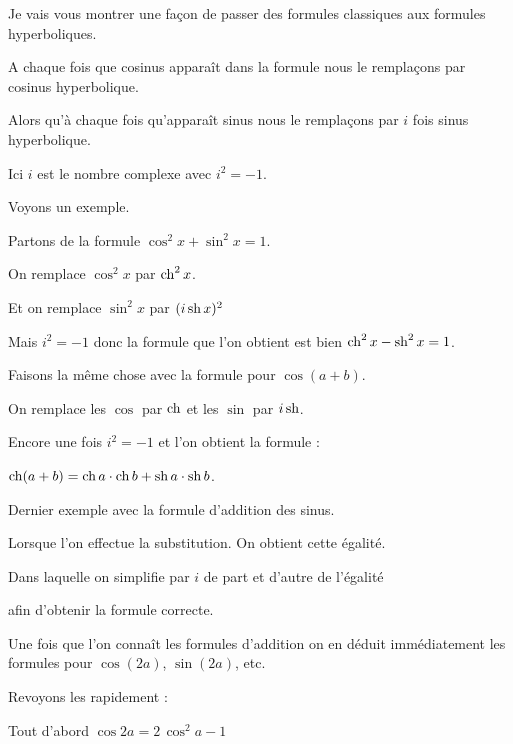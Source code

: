 Je vais vous montrer une façon de passer des formules classiques aux formules hyperboliques.

\change

A chaque fois que cosinus apparaît dans la formule nous le remplaçons par cosinus hyperbolique.

Alors qu'à chaque fois qu'apparaît sinus nous le remplaçons par $i$ fois sinus hyperbolique.

Ici $i$ est le nombre complexe avec $i^2=-1$.

\change

Voyons un exemple.

Partons de la formule $\cos^2 x + \sin^2 x = 1$.

\change

On remplace $\cos^2 x$ par $\mathop{\mathrm{ch}}\nolimits^2 x$.

Et on remplace $\sin^2 x$
par $(i\mathop{\mathrm{sh}}\nolimits x)^2$

\change

Mais $i^2=-1$ donc la formule que l'on obtient est 
bien $\mathop{\mathrm{ch}}\nolimits^2 x - \mathop{\mathrm{sh}}\nolimits^2 x = 1$.


\change

Faisons la même chose avec la formule pour $\cos(a+b)$.

\change

On remplace les $\cos$ par $\mathop{\mathrm{ch}}\nolimits$ et les $\sin$ par $i\mathop{\mathrm{sh}}\nolimits$.

\change

Encore une fois $i^2=-1$ et l'on obtient la formule :

$\mathop{\mathrm{ch}}\nolimits(a+b)=\mathop{\mathrm{ch}}\nolimits a\cdot\mathop{\mathrm{ch}}\nolimits b + \mathop{\mathrm{sh}}\nolimits a\cdot\mathop{\mathrm{sh}}\nolimits b$.



\change

Dernier exemple avec la formule d'addition des sinus.

\change

Lorsque l'on effectue la substitution.
On obtient cette égalité.

Dans laquelle on simplifie par $i$ de part et d'autre de l'égalité

\change

afin d'obtenir la formule correcte.
 

\diapo

Une fois que l'on connaît les formules d'addition on en déduit immédiatement les formules
pour $\cos(2a)$, $\sin(2a)$, etc.

Revoyons les rapidement :

Tout d'abord $\cos 2a = 2\,\cos^2a-1$

